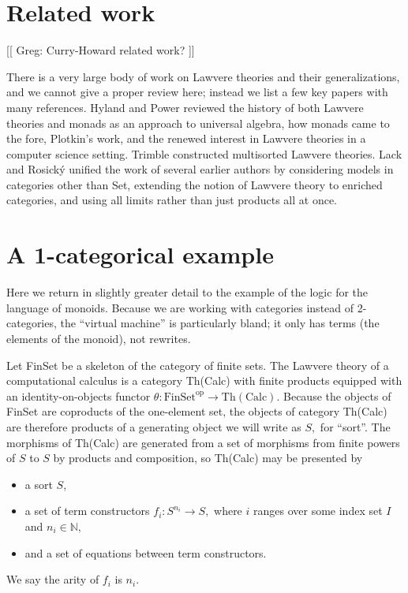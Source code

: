 \documentclass{llncs}
\newcommand{\maps}{\colon}
\newcommand{\FinSet}{\mathrm{FinSet}}
\newcommand{\op}{\mathrm{op}}
\newcommand{\NN}{\mathbb{N}}
\begin{document}
\section{Related work}
[[ Greg: Curry-Howard related work? ]]

There is a very large body of work on Lawvere theories and their generalizations, and we cannot give a proper review here; instead we list a few key papers with many references.  Hyland and Power \cite{HylandPower} reviewed the history of both Lawvere theories and monads as an approach to universal algebra, how monads came to the fore, Plotkin's work, and the renewed interest in Lawvere theories in a computer science setting.  Trimble \cite{Trimble} constructed multisorted Lawvere theories.  Lack and Rosick\'y \cite{LackRosicky} unified the work of several earlier authors by considering models in categories other than Set, extending the notion of Lawvere theory to enriched categories, and using all limits rather than just products all at once.

\section{A 1-categorical example}

Here we return in slightly greater detail to the example of the logic for the language of monoids.  Because we are working with categories instead of 2-categories, the ``virtual machine'' is particularly bland; it only has terms (the elements of the monoid), not rewrites.

Let FinSet be a skeleton of the category of finite sets.  The Lawvere theory of a computational calculus is a category Th(Calc) with finite products equipped with an identity-on-objects functor $\theta\maps \FinSet^\op \to \mathrm{Th(Calc)}.$  Because the objects of FinSet are coproducts of the one-element set, the objects of category Th(Calc) are therefore products of a generating object we will write as $S,$ for ``sort''.  The morphisms of Th(Calc) are generated from a set of morphisms from finite powers of $S$ to $S$ by products and composition, so Th(Calc) may be presented by 
\begin{itemize}
  \item a sort $S$,
  \item a set of term constructors $f_i\maps S^{n_i} \to S,$ where $i$ ranges over some index set $I$ and $n_i \in \NN,$
  \item and a set of equations between term constructors.
\end{itemize}
We say the arity of $f_i$ is $n_i.$
\end{document}
